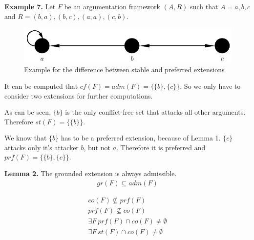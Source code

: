 \documentclass[draft,final]{vutinfth} %
\newcommand{\hl}{\par\medskip}
\newcommand{\dl}{\par\bigskip}
\begin{document}
\textbf{Example 7.} Let $F$ be an argumentation framework $(A,R)$ such that $A={a,b,c}$ and $R={(b,a),(b,c),(a,a),(c,b)}$.

\FloatBarrier
	\begin{figure}[!htb]
		\centering
		\includegraphics[width=\linewidth]{graphs/ex2.pdf}
		\caption{Example for the difference between stable and preferred extensions}
	\end{figure}
\FloatBarrier

It can be computed that $cf(F)=adm(F)=\{\{b\},\{c\}\}$. So we only have to consider two extensions for further computations.\hl
As can be seen, $\{b\}$ is the only conflict-free set that attacks all other arguments. Therefore $st(F)=\{\{b\}\}$.\hl
We know that $\{b\}$ has to be a preferred extension, because of Lemma 1. $\{c\}$ attacks only it's attacker $b$, but not $a$. Therefore it is preferred and $prf(F)=\{\{b\},\{c\}\}$.\dl

\textbf{Lemma 2.} %
The grounded extension is always admissible. %
\begin{align}
	gr(F)\subseteq adm(F)
\end{align}


\begin{align}
	co(F)\not\subseteq prf(F)\\
	prf(F)\not\subseteq co(F)\\
	\exists F\ prf(F)\cap co(F) \not = \emptyset\\
	\exists F\ st(F)\cap co(F) \not = \emptyset 
\end{align}
\end{document}
